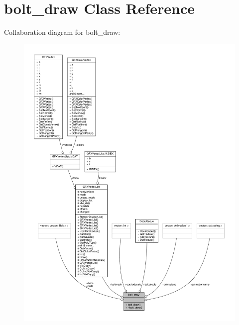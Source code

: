 \hypertarget{classbolt__draw}{}\section{bolt\+\_\+draw Class Reference}
\label{classbolt__draw}


Collaboration diagram for bolt\+\_\+draw\+:
\nopagebreak
\begin{figure}[H]
\begin{center}
\leavevmode
\includegraphics[width=350pt]{d8/dda/classbolt__draw__coll__graph}
\end{center}
\end{figure}
